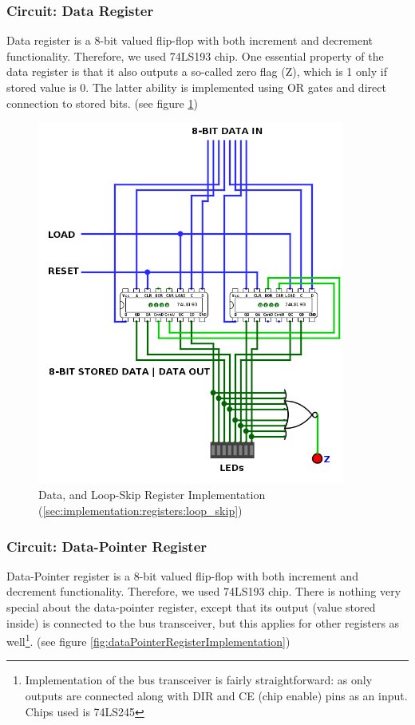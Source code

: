 \subsubsection{Circuit: Data Register}
Data register is a 8-bit valued flip-flop with both increment and decrement functionality. Therefore, we used 74LS193 chip. One essential property of the data register is that it also outputs a so-called zero flag (Z), which is 1 only if stored value is 0. The latter ability is implemented using OR gates and direct connection to stored bits. (see figure \ref{fig:dataRegisterImplementation})

\begin{figure}[H]
	\centering
	\includegraphics[width=0.9\textwidth]{img/data_register_implementation}
	\caption{Data, and Loop-Skip Register Implementation (\ref{sec:implementation:registers:loop_skip})}
	\label{fig:dataRegisterImplementation}
\end{figure}


\subsubsection{Circuit: Data-Pointer Register}
Data-Pointer register is a 8-bit valued flip-flop with both increment and decrement functionality. Therefore, we used 74LS193 chip. There is nothing very special about the data-pointer register, except that its output (value stored inside) is connected to the bus transceiver, but this applies for other registers as well\footnote{Implementation of the bus transceiver is fairly straightforward: as only outputs are connected along with DIR and CE (chip enable) pins as an input. Chips used is 74LS245}. (see figure \ref{fig:dataPointerRegisterImplementation})

